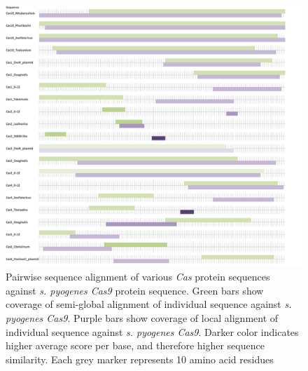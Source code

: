 \documentclass[11pt, oneside]{article}
\begin{document}
\begin{figure}[ht]
  \centering
  \includegraphics[scale = 0.45]{images/dp_figure1}
      \caption{Pairwise sequence alignment of various \textit{Cas} protein sequences against \textit{s. pyogenes Cas9} protein sequence. Green bars show coverage of semi-global alignment of individual sequence against \textit{s. pyogenes Cas9}. Purple bars show coverage of local alignment of individual sequence against \textit{s. pyogenes Cas9}. Darker color indicates higher average score per base, and therefore higher sequence similarity. Each grey marker represents 10 amino acid residues}
      \label{dp1}
\end{figure}
\end{document}
